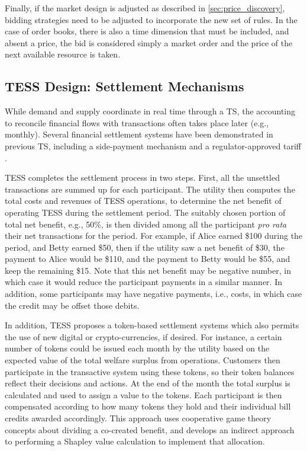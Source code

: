 Finally, if the market design is adjusted as described in \cref{sec:price_discovery}, bidding strategies need to be adjusted to incorporate the new set of rules.
In the case of order books, there is also a time dimension that must be included, and absent a price, the bid is considered simply a market order and the price of the next available resource is taken.

\subsection{TESS Design: Settlement Mechanisms}\label{sec:settlement}

While demand and supply coordinate in real time through a TS, the accounting to reconcile financial flows with transactions often takes place later (e.g., monthly). Several financial settlement systems have been demonstrated in previous TS, including a side-payment mechanism \citep{hammerstrom_2008} and a regulator-approved tariff \citep{Widergren2014}. 

TESS completes the settlement process in two steps. First, all the unsettled transactions are summed up for each participant. The utility then computes the total costs and revenues of TESS operations, to determine the net benefit of operating TESS during the settlement period.  The suitably chosen portion of total net benefit, e.g., 50\%, is then divided among all the participant \textit{pro rata} their net transactions for the period.  For example, if Alice earned \$100 during the period, and Betty earned \$50, then if the utility saw a net benefit of \$30, the payment to Alice would be \$110, and the payment to Betty would be \$55, and keep the remaining \$15. Note that this net benefit may be negative number, in which case it would reduce the participant payments in a similar manner. In addition, some participants may have negative payments, i.e., costs, in which case the credit may be offset those debits. 

In addition, TESS proposes a token-based settlement systems which also permits the use of new digital or crypto-currencies, if desired.
For instance, a certain number of tokens could be issued each month by the utility based on the expected value of the total welfare surplus from operations. Customers then participate in the transactive system using these tokens, so their token balances reflect their decisions and actions. At the end of the month the total surplus is calculated and used to assign a value to the tokens. Each participant is then compensated according to how many tokens they hold and their individual bill credits awarded accordingly. This approach uses cooperative game theory concepts about dividing a co-created benefit, and develops an indirect approach to performing a Shapley value calculation to implement that allocation.

